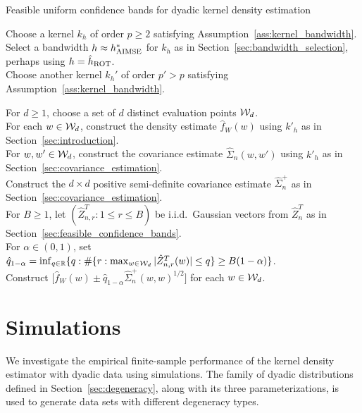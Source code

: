 \begin{algorithm}[ht]
  \caption{Feasible uniform confidence bands for
  dyadic kernel density estimation}
  \label{alg:method}

  Choose a kernel $k_h$ of order $p \geq 2$ satisfying
  Assumption~\ref{ass:kernel_bandwidth}. \\

  Select a bandwidth $h \approx h^*_{\operatorname{AIMSE}}$ for $k_h$
  as in Section~\ref{sec:bandwidth_selection},
  perhaps using $h = \hat{h}_{\operatorname{ROT}}$. \\

  Choose another kernel $k_h'$ of order $p'>p$ satisfying
  Assumption~\ref{ass:kernel_bandwidth}.

  For $d \geq 1$, choose a set of $d$
  distinct evaluation points $\mathcal{W}_d$. \\

  For each $w \in \mathcal{W}_d$, construct the density estimate $\hat f_W(w)$
  using $k'_{h}$ as in Section~\ref{sec:introduction}. \\

  For $w, w' \in \mathcal{W}_d$, construct the
  covariance estimate $\hat \Sigma_n(w,w')$
  using $k'_{h}$ as in Section~\ref{sec:covariance_estimation}. \\

  Construct the $d \times d$ positive semi-definite
  covariance estimate $\hat \Sigma_n^+$
  as in Section~\ref{sec:covariance_estimation}. \\

  For $B \geq 1$,
  let $(\hat Z_{n,r}^T: 1\leq r\leq B)$ be i.i.d.\ Gaussian vectors
  from $\hat{Z}_n^T$ as in
  Section~\ref{sec:feasible_confidence_bands}. \\

  For $\alpha \in (0,1)$, set
  $\hat q_{1-\alpha} = \inf_{q \in \mathbb{R}}
  \{ q :
    \# \{r: \max_{w\in\mathcal{W}_d}|\hat Z_{n,r}^T(w)|
    \leq q \}
  \geq B(1-\alpha) \}$. \\

  Construct
  $ \big[\hat f_W(w) \pm
  \hat q_{1-\alpha} \hat\Sigma_n^+(w,w)^{1/2} \big]$
  for each $w \in \mathcal{W}_d$.
\end{algorithm}

\section{Simulations}
\label{sec:simulations}

We investigate the
empirical finite-sample performance of
the kernel density estimator with dyadic data
using simulations.
The family of dyadic distributions
defined in Section~\ref{sec:degeneracy},
along with its three parameterizations,
is used to generate data sets with different degeneracy types.
%

